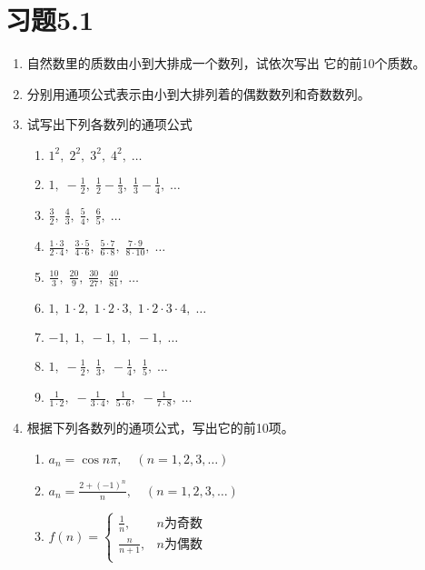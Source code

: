 \section*{习题5.1}
\begin{enumerate}
    \item 自然数里的质数由小到大排成一个数列，试依次写出
    它的前10个质数。
    \item 分别用通项公式表示由小到大排列着的偶数数列和奇数数列。
    \item 试写出下列各数列的通项公式
    \begin{multicols}{2}
 \begin{enumerate}
    \item $1^2,\; 2^2,\; 3^2,\; 4^2,\; \ldots$
    \item $1,\; -\frac{1}{2},\; \frac{1}{2}-\frac{1}{3},\; \frac{1}{3}-
    \frac{1}{4},\; \ldots$
    \item $\frac{3}{2},\; \frac{4}{3},\; \frac{5}{4},\; \frac{6}{5},\; \ldots$
    \item $\frac{1\cdot 3}{2\cdot 4},\; \frac{3\cdot 5}{4\cdot 6},\; \frac{5\cdot 7}{6\cdot 8},\; \frac{7\cdot 9}{8\cdot 10},\; \ldots$
     \item $\frac{10}{3},\; \frac{20}{9},\; \frac{30}{27},\; \frac{40}{81},\; \ldots$
     \item $1,\; 1\cdot 2,\; 1\cdot 2\cdot 3,\; 1\cdot 2\cdot 3\cdot 4,\;\ldots $
     \item $-1,\; 1,\; -1,\; 1,\; -1,\; \ldots$
     \item $1,\; -\frac{1}{2},\; \frac{1}{3},\; -\frac{1}{4},\; \frac{1}{5},\; \ldots$
     \item $\frac{1}{1\cdot 2},\; -\frac{1}{3\cdot 4},\; \frac{1}{5\cdot 6},\; -\frac{1}{7\cdot 8},\; \ldots$
\end{enumerate}       
    \end{multicols}

    \item 根据下列各数列的通项公式，写出它的前10项。
 \begin{enumerate}
    \item $a_n=\cos n\pi,\quad (n=1,2,3,\ldots)$
    \item $a_n=\frac{2+(-1)^n}{n},\quad (n=1,2,3,\ldots)$
    \item $f(n)=\begin{cases}
        \frac{1}{n},& \text{$n$为奇数}\\
        \frac{n}{n+1},& \text{$n$为偶数}\\
    \end{cases}$
\end{enumerate}       


\end{enumerate}
